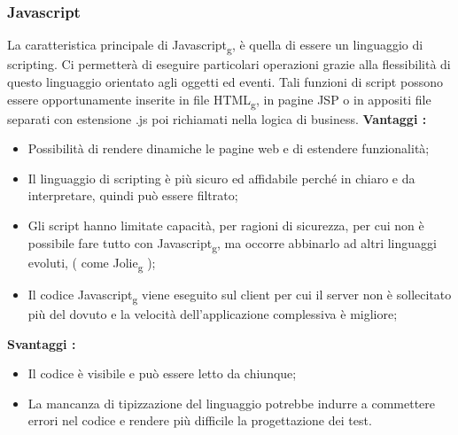 {{		\subsubsection{Javascript}{
			La caratteristica principale di Javascript\textsubscript{g}, è quella di essere un linguaggio di scripting. Ci permetterà di eseguire particolari operazioni grazie alla flessibilità di questo linguaggio orientato agli oggetti ed eventi. Tali funzioni di script possono essere opportunamente inserite in file HTML\textsubscript{g}, in pagine JSP o in appositi file separati con estensione .js poi richiamati nella logica di business.
			\textbf{Vantaggi :}
			\begin{itemize}\itemsep1pt
				\item Possibilità di rendere dinamiche le pagine web e di estendere funzionalità;
				\item Il linguaggio di scripting è più sicuro ed affidabile perché in chiaro e da interpretare, quindi può essere filtrato;
				\item Gli script hanno limitate capacità, per ragioni di sicurezza, per cui non è possibile fare tutto con Javascript\textsubscript{g}, ma occorre abbinarlo ad altri linguaggi evoluti, ( come Jolie\textsubscript{g} );
				\item Il codice Javascript\textsubscript{g} viene eseguito sul client per cui il server non è sollecitato più del dovuto e la velocità dell'applicazione complessiva è migliore;
			\end{itemize}
			\textbf{Svantaggi :}
			\begin{itemize}\itemsep1pt
				\item Il codice è visibile e può essere letto da chiunque;
				\item La mancanza di tipizzazione del linguaggio potrebbe indurre a commettere errori nel codice e rendere più difficile la progettazione dei test.
			\end{itemize}
		}
}}
